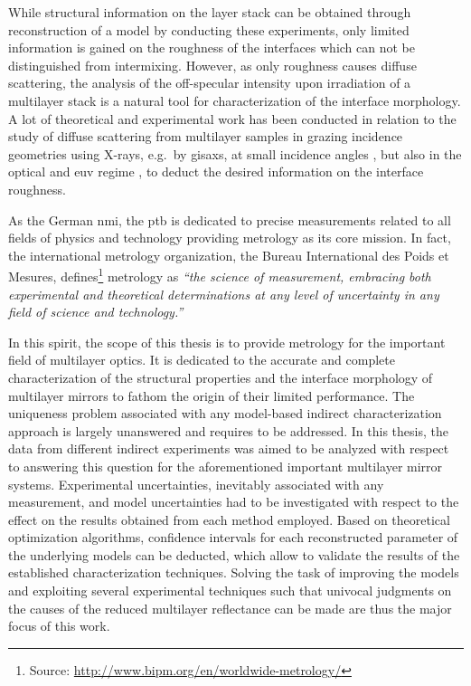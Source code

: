 While structural information on the layer stack can be obtained through reconstruction of a model by conducting these experiments, only limited information is gained on the roughness of the interfaces which can not be distinguished from intermixing. However, as only roughness causes diffuse scattering, the analysis of the off-specular intensity upon irradiation of a multilayer stack is a natural tool for characterization of the interface morphology. A lot of theoretical and experimental work has been conducted in relation to the study of diffuse scattering from multilayer samples in grazing incidence geometries using X-rays, e.g.~by \gls{gisaxs}, at small incidence angles \cite{mikulik_x-ray_1997, sinha_x-ray_1994, de_boer_x-ray_1995, de_boer_x-ray_1996, salditt_kinetic_1994, levine_grazing-incidence_1989,siffalovic_characterization_2009}, but also in the optical and \gls{euv} regime \cite{amra_light_1993, amra_light_1994, elson_light_1980, elson_relationship_1983, schroder_angle-resolved_2011, schroder_spectral_2014}, to deduct the desired information on the interface roughness.

As the German \gls{nmi}, the \gls{ptb} is dedicated to precise measurements related to all fields of physics and technology providing metrology as its core mission. In fact, the international metrology organization, the Bureau International des Poids et Mesures, defines\footnote{Source: \url{http://www.bipm.org/en/worldwide-metrology/}} metrology as \emph{``the science of measurement, embracing both experimental and theoretical determinations at any level of uncertainty in any field of science and technology.''}

In this spirit, the scope of this thesis is to provide metrology for the important field of multilayer optics. It is dedicated to the accurate and complete characterization of the structural properties and the interface morphology of multilayer mirrors to fathom the origin of their limited performance. The uniqueness problem associated with any model-based indirect characterization approach is largely unanswered and requires to be addressed. In this thesis, the data from different indirect experiments was aimed to be analyzed with respect to answering this question for the aforementioned important multilayer mirror systems. Experimental uncertainties, inevitably associated with any measurement, and model uncertainties had to be investigated with respect to the effect on the results obtained from each method employed. Based on theoretical optimization algorithms, confidence intervals for each reconstructed parameter of the underlying models can be deducted, which allow to validate the results of the established characterization techniques. Solving the task of improving the models and exploiting several experimental techniques such that univocal judgments on the causes of the reduced multilayer reflectance can be made are thus the major focus of this work.

